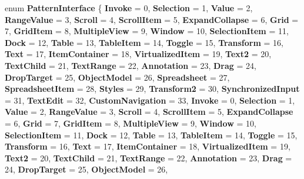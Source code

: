 \begin{DoxyCompactItemize}
enum {\bfseries Pattern\+Interface} \{ \newline
{\bfseries Invoke} = 0, 
{\bfseries Selection} = 1, 
{\bfseries Value} = 2, 
{\bfseries Range\+Value} = 3, 
\newline
{\bfseries Scroll} = 4, 
{\bfseries Scroll\+Item} = 5, 
{\bfseries Expand\+Collapse} = 6, 
{\bfseries Grid} = 7, 
\newline
{\bfseries Grid\+Item} = 8, 
{\bfseries Multiple\+View} = 9, 
{\bfseries Window} = 10, 
{\bfseries Selection\+Item} = 11, 
\newline
{\bfseries Dock} = 12, 
{\bfseries Table} = 13, 
{\bfseries Table\+Item} = 14, 
{\bfseries Toggle} = 15, 
\newline
{\bfseries Transform} = 16, 
{\bfseries Text} = 17, 
{\bfseries Item\+Container} = 18, 
{\bfseries Virtualized\+Item} = 19, 
\newline
{\bfseries Text2} = 20, 
{\bfseries Text\+Child} = 21, 
{\bfseries Text\+Range} = 22, 
{\bfseries Annotation} = 23, 
\newline
{\bfseries Drag} = 24, 
{\bfseries Drop\+Target} = 25, 
{\bfseries Object\+Model} = 26, 
{\bfseries Spreadsheet} = 27, 
\newline
{\bfseries Spreadsheet\+Item} = 28, 
{\bfseries Styles} = 29, 
{\bfseries Transform2} = 30, 
{\bfseries Synchronized\+Input} = 31, 
\newline
{\bfseries Text\+Edit} = 32, 
{\bfseries Custom\+Navigation} = 33, 
{\bfseries Invoke} = 0, 
{\bfseries Selection} = 1, 
\newline
{\bfseries Value} = 2, 
{\bfseries Range\+Value} = 3, 
{\bfseries Scroll} = 4, 
{\bfseries Scroll\+Item} = 5, 
\newline
{\bfseries Expand\+Collapse} = 6, 
{\bfseries Grid} = 7, 
{\bfseries Grid\+Item} = 8, 
{\bfseries Multiple\+View} = 9, 
\newline
{\bfseries Window} = 10, 
{\bfseries Selection\+Item} = 11, 
{\bfseries Dock} = 12, 
{\bfseries Table} = 13, 
\newline
{\bfseries Table\+Item} = 14, 
{\bfseries Toggle} = 15, 
{\bfseries Transform} = 16, 
{\bfseries Text} = 17, 
\newline
{\bfseries Item\+Container} = 18, 
{\bfseries Virtualized\+Item} = 19, 
{\bfseries Text2} = 20, 
{\bfseries Text\+Child} = 21, 
\newline
{\bfseries Text\+Range} = 22, 
{\bfseries Annotation} = 23, 
{\bfseries Drag} = 24, 
{\bfseries Drop\+Target} = 25, 
\newline
{\bfseries Object\+Model} = 26, 

\end{DoxyCompactItemize}

